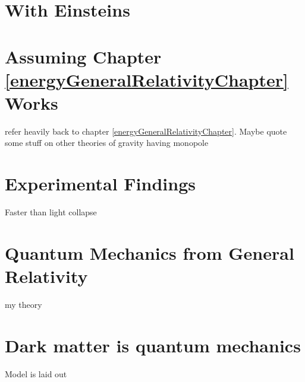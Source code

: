 \documentclass[../rzero]{subfiles}
\begin{document}
\section{With Einsteins }

\section{Assuming Chapter \ref{energyGeneralRelativityChapter} Works}
	refer heavily back to chapter \ref{energyGeneralRelativityChapter}. Maybe quote some stuff on other theories of gravity having monopole 

\section{Experimental Findings}
Faster than light collapse



\section{Quantum Mechanics from General Relativity}
my theory


\section{Dark matter is quantum mechanics}
	Model is laid out 
\end{document}
